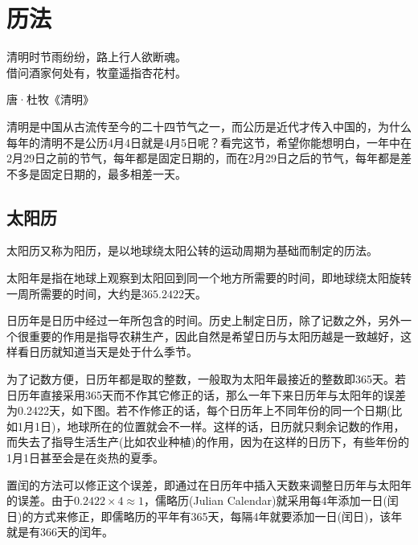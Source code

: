 
\chapter{历法}
\label{chap:calendar}

\epigraph{清明时节雨纷纷，路上行人欲断魂。\\借问酒家何处有，牧童遥指杏花村。}{唐·杜牧《清明》}

清明是中国从古流传至今的二十四节气之一，而公历是近代才传入中国的，为什么每年的清明不是公历4月4日就是4月5日呢？看完这节，希望你能想明白，一年中在2月29日之前的节气，每年都是固定日期的，而在2月29日之后的节气，每年都是差不多是固定日期的，最多相差一天。

\section{太阳历}
\label{sec:solar-calendars}

太阳历又称为阳历，是以地球绕太阳公转的运动周期为基础而制定的历法。

\begin{definition}
  太阳年是指在地球上观察到太阳回到同一个地方所需要的时间，即地球绕太阳旋转一周所需要的时间，大约是$365.2422$天。
\end{definition}

日历年是日历中经过一年所包含的时间。历史上制定日历，除了记数之外，另外一个很重要的作用是指导农耕生产，因此自然是希望日历与太阳历越是一致越好，这样看日历就知道当天是处于什么季节。

为了记数方便，日历年都是取的整数，一般取为太阳年最接近的整数即365天。若日历年直接采用365天而不作其它修正的话，那么一年下来日历年与太阳年的误差为0.2422天，如下图。若不作修正的话，每个日历年上不同年份的同一个日期(比如1月1日)，地球所在的位置就会不一样。这样的话，日历就只剩余记数的作用，而失去了指导生活生产(比如农业种植)的作用，因为在这样的日历下，有些年份的1月1日甚至会是在炎热的夏季。

置闰的方法可以修正这个误差，即通过在日历年中插入天数来调整日历年与太阳年的误差。由于$0.2422\times4\approx1$，儒略历(Julian Calendar)就采用每4年添加一日(闰日)的方式来修正，即儒略历的平年有365天，每隔4年就要添加一日(闰日)，该年就是有366天的闰年。

